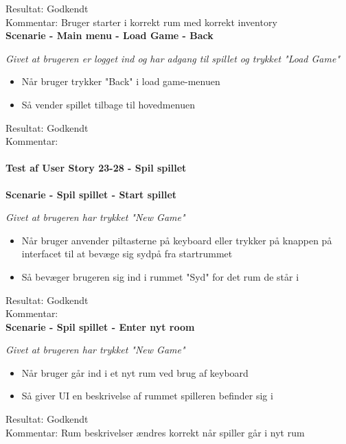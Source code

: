 Resultat: Godkendt\\
Kommentar: Bruger starter i korrekt rum med korrekt inventory\\

\bf{Scenarie - Main menu - Load Game - Back}

\it{Givet at brugeren er logget ind og har adgang til spillet og trykket "Load Game"}

\begin{itemize}
  \item Når bruger trykker "Back" i load game-menuen
  \item Så vender spillet tilbage til hovedmenuen
\end{itemize}

Resultat: Godkendt\\
Kommentar:\\

\paragraph{Test af User Story 23-28 - Spil spillet}

\bf{Scenarie - Spil spillet - Start spillet}

\it{Givet at brugeren har trykket "New Game"}

\begin{itemize}
  \item Når bruger anvender piltasterne på keyboard eller trykker på knappen på interfacet til at bevæge sig sydpå fra startrummet
  \item Så bevæger brugeren sig ind i rummet "Syd" for det rum de står i
\end{itemize}

Resultat: Godkendt\\
Kommentar:\\

\bf{Scenarie - Spil spillet - Enter nyt room}

\it{Givet at brugeren har trykket "New Game"}

\begin{itemize}
  \item Når bruger går ind i et nyt rum ved brug af keyboard
  \item Så giver UI en beskrivelse af rummet spilleren befinder sig i
\end{itemize}

Resultat: Godkendt\\
Kommentar: Rum beskrivelser ændres korrekt når spiller går i nyt rum\\

